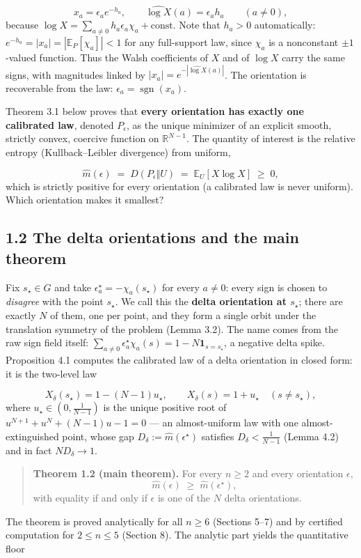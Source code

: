 \documentclass[11pt]{article}
\begin{document}
\[
x_a = \epsilon_a e^{-h_a}, \qquad
\widehat{\log X}(a) = \epsilon_a h_a \qquad (a \ne 0),
\]
because $\log X = \sum_{a \ne 0} h_a\epsilon_a\chi_a + \text{const}$. Note that $h_a > 0$ automatically: $e^{-h_a} = |x_a| = |\mathbb{E}_P[\chi_a]| < 1$ for any full-support law, since $\chi_a$ is a nonconstant $\pm1$-valued function. Thus the Walsh coefficients of $X$ and of $\log X$ carry the same signs, with magnitudes linked by $|x_a| = e^{-|\widehat{\log X}(a)|}$. The orientation is recoverable from the law: $\epsilon_a = \operatorname{sgn}(x_a)$.

Theorem 3.1 below proves that \textbf{every orientation has exactly one calibrated law}, denoted $P_\epsilon$, as the unique minimizer of an explicit smooth, strictly convex, coercive function on $\mathbb{R}^{N-1}$.  The quantity of interest is the relative entropy (Kullback–Leibler divergence) from uniform,

\[
\widehat m(\epsilon) \;=\; D(P_\epsilon \Vert U)
\;=\; \mathbb{E}_U[X \log X] \;\ge\; 0 ,
\]
which is strictly positive for every orientation (a calibrated law is never uniform).  Which orientation makes it smallest?

\subsection*{1.2 The delta orientations and the main theorem}
Fix $s_\star \in G$ and take $\epsilon_a^\star = -\chi_a(s_\star)$ for every $a \ne 0$: every sign is chosen to \emph{disagree} with the point $s_\star$.  We call this the \textbf{delta orientation at $s_\star$}; there are exactly $N$ of them, one per point, and they form a single orbit under the translation symmetry of the problem (Lemma 3.2).  The name comes from the raw sign field itself: $\sum_{a\ne0} \epsilon^\star_a\chi_a(s) = 1 - N\mathbf{1}_{s = s_\star}$, a negative delta spike.  Proposition 4.1 computes the calibrated law of a delta orientation in closed form: it is the two-level law

\[
X_\delta(s_\star) = 1 - (N-1)u_\star, \qquad
X_\delta(s) = 1 + u_\star \quad (s \ne s_\star),
\]
where $u_\star \in (0, \tfrac1{N-1})$ is the unique positive root of $u^{N+1} + u^N + (N-1)u - 1 = 0$ — an almost-uniform law with one almost-extinguished point, whose gap $D_\delta := \widehat m(\epsilon^\star)$ satisfies $D_\delta < \frac{1}{N-1}$ (Lemma 4.2) and in fact $N D_\delta \to 1$.

\begin{quote}
\textbf{Theorem 1.2 (main theorem).}  For every $n \ge 2$ and every orientation $\epsilon$,
\[
\widehat m(\epsilon) \;\ge\; \widehat m(\epsilon^\star),
\]
with equality if and only if $\epsilon$ is one of the $N$ delta orientations.
\end{quote}
The theorem is proved analytically for all $n \ge 6$ (Sections 5–7) and by certified computation for $2 \le n \le 5$ (Section 8).  The analytic part yields the quantitative floor
\end{document}
